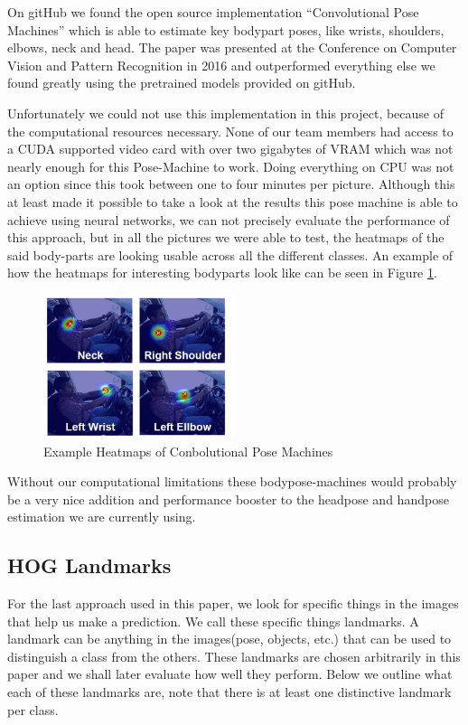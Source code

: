 \documentclass[10pt,twocolumn,letterpaper]{article}
\begin{document}
On gitHub we found the open source implementation ``Convolutional Pose Machines'' which is able to estimate key bodypart poses, like wrists, shoulders, elbows, neck and head.\cite{DBLP:journals/corr/WeiRKS16} The paper was presented at the Conference on Computer Vision and Pattern Recognition in 2016 and outperformed everything else we found greatly using the pretrained models provided on gitHub. 

Unfortunately we could not use this implementation in this project, because of the computational resources necessary. None of our team members had access to a CUDA supported video card with over two gigabytes of VRAM which was not nearly enough for this Pose-Machine to work. Doing everything on CPU was not an option since this took between one to four minutes per picture. Although this at least made it possible to take a look at the results this pose machine is able to achieve using neural networks, we can not precisely evaluate the performance of this approach, but in all the pictures we were able to test, the heatmaps of the said body-parts are looking usable across all the different classes. An example of how the heatmaps for interesting bodyparts look like can be seen in Figure \ref{BodyPoseExample}.\\
\begin{figure}[h]
    \centering
    \includegraphics[width=0.5\textwidth]{BodyPoseExample}
    \caption{Example Heatmaps of Conbolutional Pose Machines}
    \label{BodyPoseExample}
\end{figure}

Without our computational limitations these bodypose-machines would probably be a very nice addition and performance booster to the headpose and handpose estimation we are currently using.


\subsection{HOG Landmarks}

For the last approach used in this paper, we look for specific things in the images that help us make a prediction. We call these specific things landmarks. A landmark can be anything in the images(pose, objects, etc.) that can be used to distinguish a class from the others. These landmarks are chosen arbitrarily in this paper and we shall later evaluate how well they perform. Below we outline what each of these landmarks are, note that there is at least one distinctive landmark per class.
\end{document}
